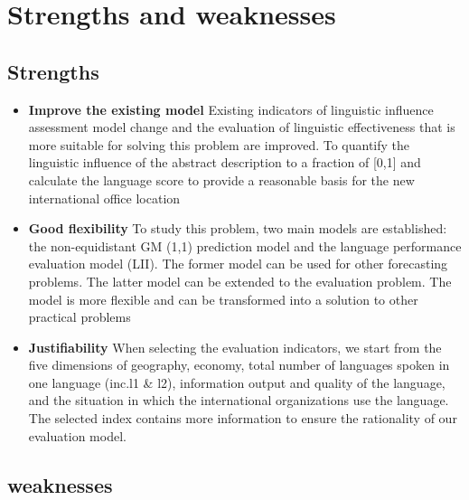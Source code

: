 \section{Strengths and weaknesses}
\subsection{Strengths}
\begin{itemize}
	\item \textbf{Improve the existing model}
\newline Existing indicators of linguistic influence assessment model change and the evaluation of linguistic effectiveness that is more suitable for solving this problem are improved. To quantify the linguistic influence of the abstract description to a fraction of [0,1] and calculate the language score to provide a reasonable basis for the new international office location
	\item \textbf{Good flexibility}
\newline To study this problem, two main models are established: the non-equidistant GM (1,1) prediction model and the language performance evaluation model (LII). The former model can be used for other forecasting problems. The latter model can be extended to the evaluation problem. The model is more flexible and can be transformed into a solution to other practical problems
	\item \textbf{Justifiability}
\newline When selecting the evaluation indicators, we start from the five dimensions of geography, economy, total number of languages spoken in one language (inc.l1 \& l2), information output and quality of the language, and the situation in which the international organizations use the language. The selected index contains more information to ensure the rationality of our evaluation model.	
	
\end{itemize}

\subsection{weaknesses}

